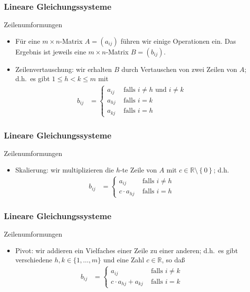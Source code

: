 \documentclass{beamer}
\title[Linadi]{\mytitle}
\author[Amin Coja-Oghlan]{Amin Coja-Oghlan}
\institute[Frankfurt]{JWGUFFM}
\date{}
\newcommand\RR{\mathbb R}
\newcommand\cbc[1]{\left\{{#1}\right\}}
\newcommand{\ue}{\"u}
\newcommand{\mytitle}{Lineare Gleichungssysteme}
\begin{document}
\frame[plain]{\titlepage}

\begin{frame}\frametitle{\mytitle}
	\begin{block}{Zeilenumformungen}
	\begin{itemize}
	\item F\ue r eine $m\times n$-Matrix $A=(a_{ij})$ f\ue hren wir einige Operationen ein.
	Das Ergebnis ist jeweils eine $m\times n$-Matrix $B=(b_{ij})$.
	\item \alert{Zeilenvertauschung:} wir erhalten $B$  durch Vertauschen von zwei Zeilen von $A$; d.h.\ es gibt $1\leq h<k\leq m$ mit
	\begin{align*}
		b_{ij}&=\begin{cases}
			a_{ij}&\mbox{ falls $i\neq h$ und $i\neq k$}\\
			a_{hj}&\mbox{ falls $i=k$}\\
			a_{kj}&\mbox{ falls $i=h$}
		\end{cases}
	\end{align*}
	\end{itemize}
	\end{block}
\end{frame}

\begin{frame}\frametitle{\mytitle}
	\begin{block}{Zeilenumformungen}
	\begin{itemize}
	\item \alert{Skalierung:} wir multiplizieren die $h$-te Zeile von $A$ mit $c\in\RR\setminus\cbc 0$; d.h.\ 
	\begin{align*}
		b_{ij}&=\begin{cases}
			a_{ij}&\mbox{ falls $i\neq h$}\\
			c\cdot a_{hj}&\mbox{ falls $i=h$}
		\end{cases}
	\end{align*}
	\end{itemize}
	\end{block}
\end{frame}

\begin{frame}\frametitle{\mytitle}
	\begin{block}{Zeilenumformungen}
	\begin{itemize}
		\item \alert{Pivot:} wir addieren ein Vielfaches einer Zeile zu einer anderen; d.h.\ es gibt verschiedene $h,k\in\{1,\ldots,m\}$ und eine Zahl $c\in\RR$, so da\ss\
	\begin{align*}
		b_{ij}&=\begin{cases}
			a_{ij}&\mbox{ falls $i\neq k$}\\
			c\cdot a_{hj}+a_{kj}&\mbox{ falls $i=k$}
		\end{cases}
	\end{align*}
	\end{itemize}
	\end{block}
\end{frame}
\end{document}
